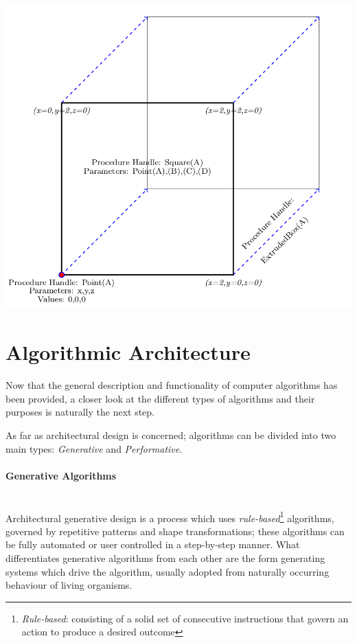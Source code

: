 \documentclass[11pt,a4paper,oneside]{article}
\newenvironment{Figure}		%
	{\par\medskip\noindent\minipage{\linewidth}}
	{\endminipage\par\medskip}
\begin{document}
\begin{multicols}{2}
\begin{Figure}
	\includegraphics[width=\linewidth]{./Images/1-Box}
	\label{fig:Box}
\end{Figure}

\section{Algorithmic Architecture}

Now that the general description and functionality of computer algorithms has been provided, a closer look at the different types of algorithms and their purposes is naturally the next step.

As far as architectural design is concerned; algorithms can be divided into two main types: \emph{Generative} and \emph{Performative}. \cite{fasoulaki08}

	\paragraph{Generative Algorithms}\mbox{}\\[3mm]
Architectural generative design is a process which uses \emph{rule-based}\footnote{\emph{Rule-based}: consisting of a solid set of consecutive instructions that govern an action to produce a desired outcome} algorithms, governed by repetitive patterns and shape transformations; these algorithms can be fully automated or user controlled in a step-by-step manner. What differentiates generative algorithms from each other are the form generating systems which drive the algorithm, usually adopted from naturally occurring behaviour of living organisms. \cite{arida04}


\end{multicols}
\end{document}
